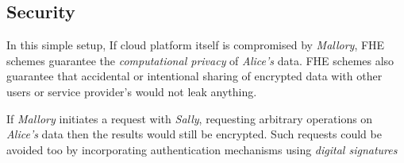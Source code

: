 \documentclass[conference]{IEEEtran}
\numberwithin{equation}{section}
\begin{document}
 \subsection{Security}
In this simple setup, If cloud platform itself is compromised by \emph{Mallory}, FHE schemes guarantee the \emph{computational privacy} of \emph{Alice's} data. FHE schemes also guarantee that accidental or intentional sharing of encrypted data with other users or service provider's would not leak anything.

 If \emph{Mallory} initiates a request with \emph{Sally}, requesting arbitrary operations on \emph{Alice's} data then the results would still be encrypted. Such requests could be avoided too by incorporating authentication mechanisms using \emph{digital signatures} 
 \begin{comment}
  as mentioned in secure version of this protocol given in the Table \ref{basicProtocolSec}. 
 \begin{table}
\caption{Basic Protocol Secure Version}
\label{basicProtocolSec}
\renewcommand{\arraystretch}{2.5}
\begin{center}
\begin{tabular} {| c c c c | }
\hline
&\bf{Data Preparation}&&  \\
{1}&{A}&{:=}&{{$data^1$}= $\emph{encrypt}_{PK_a}$(data)} \\
{2}&{A$\quad \rightarrow \quad$S}&{:=}&{$\emph{sign}_{SK_a}$($data^1$)} \\
{3}&{S}&{:=}&{$\emph{verifySig}_{PK_a}$($\emph{sign}_{SK_a}$)} \\
\hline 
\hline
&\bf{Protocol Steps}&&  \\
{1}&{A}&{:=}&{{$x^1$}=$\emph{encrypt}_{PK_a}$(x)} \\
{2}&{A$\quad \rightarrow \quad$S}&{:=}&{ $\emph{sign}_{SK_a}$(\emph{func},$x^1$)} \\
{3}&{S}&{:=}& {$\emph{verifySig}_{PK_a}$($\emph{sign}_{SK_a}$)} \\
{4}&{S}&{:=}&{ {$y^1$}= $\emph{eval}_{PK_a}$(\emph{func},$x^1$,$data^1$)} \\
{5}&{S$\quad \rightarrow \quad$A}&{:=}&{ $\emph{sign}_{SK_s}$ ($y^1$)} \\
{6}&{A}&{:=}&{ $\emph{verifySig}_{PK_s}$($\emph{sign}_{SK_s}$) } \\
{7}&{A}&{:=}&{y =  $\emph{decrypt}_{SK_a}$($y^1$)} \\
 \hline
\end{tabular}
\end{center}
\end{table}
\end{comment}
\end{document}
